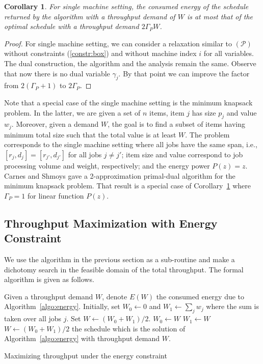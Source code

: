 \documentclass[11pt,a4paper]{article}
\newtheorem{corollary}{Corollary}
\begin{document}
\begin{corollary}	\label{cor:single-machine}
For single machine setting, 
the consumed energy of the schedule returned by the algorithm with a throughput demand of
$W$ is at most that of the optimal schedule with a throughput 
demand $2\Gamma_{P}W$.
\end{corollary}
\begin{proof}
For single machine setting, we can consider a relaxation similar to $(\mathcal{P})$
without constraints (\ref{constr:box}) and without machine index $i$ for all variables. 
The dual construction, the algorithm and the analysis remain the same. Observe that now 
there is no dual variable $\gamma_{j}$. By that point we can improve the factor 
from $2(\Gamma_{P}+1)$ to $2\Gamma_{P}$.
\end{proof}

Note that a special case of the single machine setting is the minimum knapsack problem.
In the latter, we are given a set of $n$ items, item $j$ has size $p_{j}$ and value $w_{j}$.
Moreover, given a demand $W$, the goal is to find a subset of items having minimum total 
size such that the total value is at least $W$. The problem corresponds to the single machine 
setting where all jobs have the same span, i.e., $[r_{j},d_{j}] = [r_{j'},d_{j'}]$ for all jobs
$j \neq j'$; item size and value correspond to job processing volume and weight, respectively;
and the energy power $P(z) = z$. Carnes and Shmoys \cite{CarnesShmoys08:Primal-Dual-Schema} 
gave a 2-approximation primal-dual
algorithm for the minimum knapsack problem. That result is a special case of 
Corollary~\ref{cor:single-machine} where $\Gamma_{P} = 1$ for linear function $P(z)$. 

\subsection{Throughput Maximization with Energy Constraint} 	\label{sec:approx-throughput}
We use the algorithm in the previous section as a sub-routine and 
make a dichotomy search in the feasible domain of the total throughput. 
The formal algorithm is given as follows.

\begin{algorithm}[htbp]
\begin{algorithmic}[1] 
\STATE Given a throughput demand $W$, denote $E(W)$ the 
	consumed energy due to Algorithm~\ref{algo:energy}. 
\STATE Initially, set $W_{0} \gets 0$ and $W_{1} \gets \sum_{j} w_{j}$ where the sum is taken over all jobs $j$.
\STATE Set $W \gets (W_{0} + W_{1})/2$.
		\STATE $W_{0} \gets W$
	\ENDIF
		\STATE $W_{1} \gets W$
	\ENDIF
	\STATE $W \gets (W_{0} + W_{1})/2$
\ENDWHILE
\RETURN the schedule which is the solution of Algorithm~\ref{algo:energy} with throughput demand $W$.
\end{algorithmic}
\caption{Maximizing throughput under the energy constraint}
\label{algo:throughput}
\end{algorithm}
\end{document}

